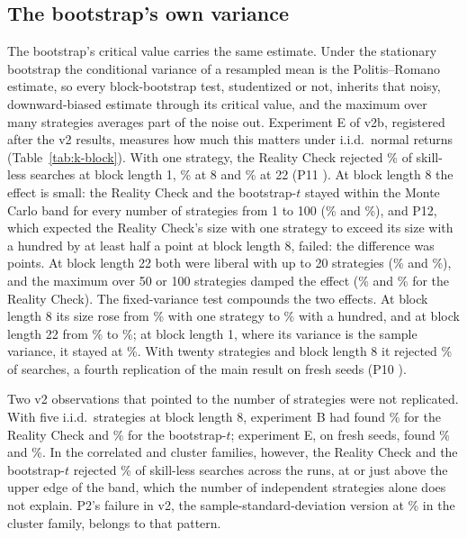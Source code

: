\subsection{The bootstrap's own variance}
\label{sec:inherit}
The bootstrap's critical value carries the same estimate. Under the stationary bootstrap the conditional variance of a resampled mean is the Politis--Romano estimate, so every block-bootstrap test, studentized or not, inherits that noisy, downward-biased estimate through its critical value, and the maximum over many strategies averages part of the noise out. Experiment E of v2b, registered after the v2 results, measures how much this matters under i.i.d.\ normal returns (Table~\ref{tab:k-block}). With one strategy, the Reality Check rejected \% of skill-less searches at block length 1, \% at 8 and \% at 22 (P11 ). At block length 8 the effect is small: the Reality Check and the bootstrap-$t$ stayed within the Monte Carlo band for every number of strategies from 1 to 100 (\% and \%), and P12, which expected the Reality Check's size with one strategy to exceed its size with a hundred by at least half a point at block length 8, failed: the difference was  points. At block length 22 both were liberal with up to 20 strategies (\% and \%), and the maximum over 50 or 100 strategies damped the effect (\% and \% for the Reality Check). The fixed-variance test compounds the two effects. At block length 8 its size rose from \% with one strategy to \% with a hundred, and at block length 22 from \% to \%; at block length 1, where its variance is the sample variance, it stayed at \%. With twenty strategies and block length 8 it rejected \% of searches, a fourth replication of the main result on fresh seeds (P10 ).

Two v2 observations that pointed to the number of strategies were not replicated. With five i.i.d.\ strategies at block length 8, experiment B had found \% for the Reality Check and \% for the bootstrap-$t$; experiment E, on fresh seeds, found \% and \%. In the correlated and cluster families, however, the Reality Check and the bootstrap-$t$ rejected \% of skill-less searches across the runs, at or just above the upper edge of the band, which the number of independent strategies alone does not explain. P2's failure in v2, the sample-standard-deviation version at \% in the cluster family, belongs to that pattern.

